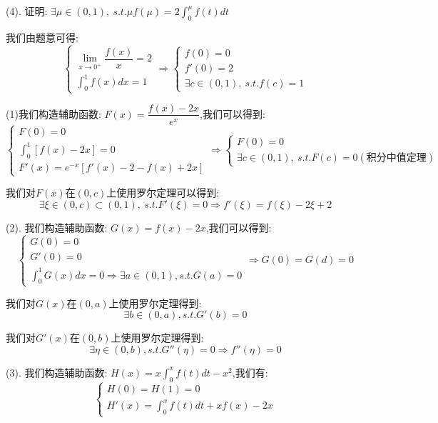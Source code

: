 (4). 证明:  $\exists \mu\in(0,1),\ s.t. \mu f(\mu)=2\int_{0}^{\mu}f(t)dt$
\begin{solution}

	我们由题意可得:  
	$$\left\lbrace
	\begin{array}{l}
		\lim\limits_{x\rightarrow 0^{+}}\dfrac{f(x)}{x}=2\\
		\int_{0}^{1}f(x)dx=1
	\end{array}
	\right. \Rightarrow \left\lbrace
	\begin{array}{l}
		f(0)=0\\
		f'(0)=2\\
		\exists c\in(0,1),\ s.t. f(c)=1
	\end{array}
	\right. $$
	
	(1)我们构造辅助函数:  $F(x)=\dfrac{f(x)-2x}{e^x}$,我们可以得到:  
	$$\left\lbrace
	\begin{array}{l}
		F(0)=0\\
		\int_{0}^{1}[f(x)-2x]=0\\
		F'(x)=e^{-x}[f'(x)-2-f(x)+2x]
	\end{array}
	\right. \Rightarrow \left\lbrace
	\begin{array}{l}
		F(0)=0\\
		\exists c\in(0,1),\ s.t. F(c)=0(\text{积分中值定理})
	\end{array}
	\right. $$
	
	我们对$F(x)$在$(0,c)$上使用罗尔定理可以得到:  
	$$\exists \xi\in(0,c)\subset(0,1),\ s.t. F'(\xi)=0\Rightarrow f'(\xi)=f(\xi)-2\xi+2$$
	
	(2). 我们构造辅助函数:  $G(x)=f(x)-2x$,我们可以得到:  
	$$\left\lbrace
	\begin{array}{l}
		G(0)=0\\
		G'(0)=0\\
		\int_{0}^{1}G(x)dx=0\Rightarrow \exists a\in(0,1),s.t. G(a)=0
	\end{array}
	\right. \Rightarrow G(0)=G(d)=0$$
	
	我们对$G(x)$在$(0,a)$上使用罗尔定理得到:  
	$$\exists b\in(0,a),s.t. G'(b)=0$$
	
	我们对$G'(x)$在$(0,b)$上使用罗尔定理得到:  
	$$\exists \eta\in(0,b),s.t. G''(\eta)=0\Rightarrow f''(\eta)=0$$
	
	(3). 我们构造辅助函数:  $H(x)=x\int_{0}^{x}f(t)dt-x^2$,我们有:  
	$$\left\lbrace
	\begin{array}{l}
		H(0)=H(1)=0\\
		H'(x)=\int_{0}^{x}f(t)dt+xf(x)-2x
	\end{array}
	\right. $$
	

\end{solution}
